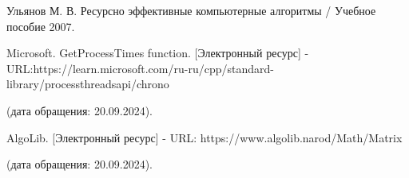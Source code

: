 \documentclass[14pt]{article}
\begin{document}
\begin{list}{.}{ \leftmargin=0pt \rightmargin=0pt}
	\item \justifying Ульянов М. В. Ресурсно эффективные компьютерные алгоритмы / Учебное пособие 2007.\label{s:1}
	
	\item \justifying Microsoft. GetProcessTimes function. [Электронный ресурс] - URL:https://learn.microsoft.com/ru-ru/cpp/standard-library/processthreadsapi/chrono \par
	(дата обращения: 20.09.2024).\label{s:2}
	
	\item \justifying AlgoLib. [Электронный ресурс] - URL: https://www.algolib.narod/Math/Matrix \par
	(дата обращения: 20.09.2024).\label{s:3}
\end{list}
\end{document}
